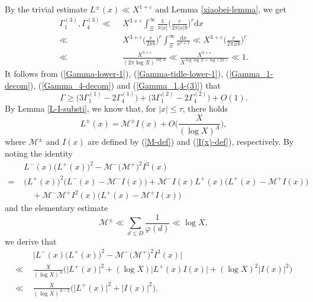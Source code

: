 \documentclass[a4paper,oneside,11pt]{article}%
\numberwithin{equation}{section}
\begin{document}
By the trivial estimate $L^\pm(x)\ll X^{1+\varepsilon}$ and Lemma \ref{xiaobei-lemma}, we get
\begin{align}\label{Gamma_1,4-(3)}
             \Gamma_1^{(3)},\Gamma_4^{(3)}
  \ll & \,\, X^{3+\varepsilon}\int_{\Xi}^\infty\frac{1}{\pi|x|}\bigg(\frac{r}{2\pi|x|b}\bigg)^r\mathrm{d}x
                 \nonumber \\
  \ll & \,\, X^{3+\varepsilon}\bigg(\frac{r}{2\pi b}\bigg)^r\int_{\Xi}^\infty\frac{\mathrm{d}x}{x^{r+1}}
             \ll X^{3+\varepsilon}\bigg(\frac{r}{2\pi\Xi b}\bigg)^r
                 \nonumber \\
  \ll & \,\, \frac{X^{3+\varepsilon}}{(2\pi\log X)^{\log X}}\ll \frac{X^{3+\varepsilon}}{X^{\log\log X+\log(2\pi)}}\ll1.
\end{align}
It follows from (\ref{Gamma-lower-1}), (\ref{Gamma-tidle-lower-1}), (\ref{Gamma_1-decom}), (\ref{Gamma_4-decom}) and (\ref{Gamma_1,4-(3)}) that
\begin{equation}\label{Gamma-lower-decom}
  \Gamma\geqslant\Big(3\Gamma_1^{(1)}-2\Gamma_4^{(1)}\Big)+\Big(3\Gamma_1^{(2)}-2\Gamma_4^{(2)}\Big)+O(1).
\end{equation}
By Lemma \ref{L-I-substi}, we know that, for $|x|\leqslant\tau$, there holds
\begin{equation*}
  L^\pm(x)=\mathcal{M}^\pm I(x)+O\bigg(\frac{X}{(\log X)^A}\bigg),
\end{equation*}
where $\mathcal{M}^\pm$ and $I(x)$ are defined by (\ref{M-def}) and (\ref{I(x)-def}), respectively. By noting the identity
\begin{align*}
   & \,\, L^-(x)\big(L^+(x)\big)^2-\mathcal{M}^-\big(\mathcal{M}^+\big)^2I^3(x)
                 \nonumber \\
 = & \,\, \big(L^+(x)\big)^2\big(L^-(x)-\mathcal{M}^-I(x)\big)+\mathcal{M}^-I(x)L^+(x)\big(L^+(x)-\mathcal{M}^+I(x)\big)
                 \nonumber \\
   & \,\,\quad  +\mathcal{M}^-\mathcal{M}^+I^2(x)\big(L^+(x)-\mathcal{M}^+I(x)\big)
\end{align*}
and the elementary estimate
\begin{equation*}
  \mathcal{M}^\pm\ll\sum_{d\leqslant D}\frac{1}{\varphi(d)}\ll\log X,
\end{equation*}
we derive that
\begin{align*}
  & \,\, \Big|L^-(x)\big(L^+(x)\big)^2-\mathcal{M}^-\big(\mathcal{M}^+\big)^2I^3(x)\Big|
                  \nonumber \\
\ll & \,\, \frac{X}{(\log X)^A}\Big(\big|L^+(x)\big|^2+(\log X)\big|L^+(x)I(x)\big|+(\log X)^2\big|I(x)\big|^2\Big)
                  \nonumber \\
\ll & \,\, \frac{X}{(\log X)^{A-2}}\Big(\big|L^+(x)\big|^2+\big|I(x)\big|^2\Big).
\end{align*}
\end{document}
